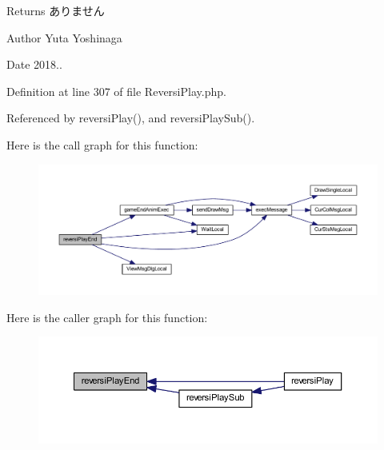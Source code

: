 \begin{DoxyReturn}{Returns}
ありません 
\end{DoxyReturn}
\begin{DoxyAuthor}{Author}
Yuta Yoshinaga 
\end{DoxyAuthor}
\begin{DoxyDate}{Date}
2018.. 
\end{DoxyDate}


Definition at line 307 of file Reversi\+Play.\+php.



Referenced by reversi\+Play(), and reversi\+Play\+Sub().

Here is the call graph for this function\+:
\nopagebreak
\begin{figure}[H]
\begin{center}
\leavevmode
\includegraphics[width=350pt]{class_reversi_play_af55fe6b6f2005c7da80c696ed692783d_cgraph}
\end{center}
\end{figure}
Here is the caller graph for this function\+:
\nopagebreak
\begin{figure}[H]
\begin{center}
\leavevmode
\includegraphics[width=350pt]{class_reversi_play_af55fe6b6f2005c7da80c696ed692783d_icgraph}
\end{center}
\end{figure}
\mbox{\label{class_reversi_play_a67816fe65a87e35d8e8cc35d5d269bcb}} 
